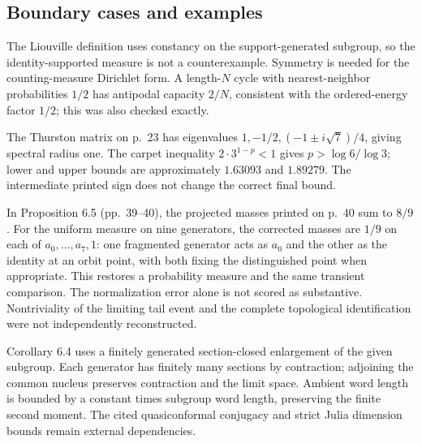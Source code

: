 \documentclass[10pt]{article}
\begin{document}
\subsection*{Boundary cases and examples}
The Liouville definition uses constancy on the support-generated subgroup, so the identity-supported measure is not a counterexample. Symmetry is needed for the counting-measure Dirichlet form. A length-\(N\) cycle with nearest-neighbor probabilities \(1/2\) has antipodal capacity \(2/N\), consistent with the ordered-energy factor \(1/2\); this was also checked exactly.\par
The Thurston matrix on p. 23 has eigenvalues \(1,-1/2,(-1\pm i\sqrt7)/4\), giving spectral radius one. The carpet inequality \(2\cdot3^{1-p}<1\) gives \(p>\log6/\log3\); lower and upper bounds are approximately \(1.63093\) and \(1.89279\). The intermediate printed sign does not change the correct final bound.\par
In Proposition 6.5 (pp. 39–40), the projected masses printed on p. 40 sum to \(8/9\). For the uniform measure on nine generators, the corrected masses are \(1/9\) on each of \(a_0,\ldots,a_7,1\): one fragmented generator acts as \(a_0\) and the other as the identity at an orbit point, with both fixing the distinguished point when appropriate. This restores a probability measure and the same transient comparison. The normalization error alone is not scored as substantive. Nontriviality of the limiting tail event and the complete topological identification were not independently reconstructed.\par
Corollary 6.4 uses a finitely generated section-closed enlargement of the given subgroup. Each generator has finitely many sections by contraction; adjoining the common nucleus preserves contraction and the limit space. Ambient word length is bounded by a constant times subgroup word length, preserving the finite second moment. The cited quasiconformal conjugacy and strict Julia dimension bounds remain external dependencies.\par
\end{document}
